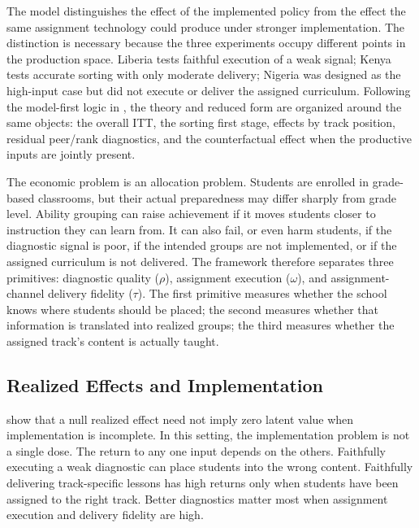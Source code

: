 \documentclass[11pt]{article}
\begin{document}
The model distinguishes the effect of the implemented policy from the effect the same assignment technology could produce under stronger implementation. The distinction is necessary because the three experiments occupy different points in the production space. Liberia tests faithful execution of a weak signal; Kenya tests accurate sorting with only moderate delivery; Nigeria was designed as the high-input case but did not execute or deliver the assigned curriculum. Following the model-first logic in \citet{duflo2011peer}, the theory and reduced form are organized around the same objects: the overall ITT, the sorting first stage, effects by track position, residual peer/rank diagnostics, and the counterfactual effect when the productive inputs are jointly present.

The economic problem is an allocation problem. Students are enrolled in grade-based classrooms, but their actual preparedness may differ sharply from grade level. Ability grouping can raise achievement if it moves students closer to instruction they can learn from. It can also fail, or even harm students, if the diagnostic signal is poor, if the intended groups are not implemented, or if the assigned curriculum is not delivered. The framework therefore separates three primitives: diagnostic quality ($\rho$), assignment execution ($\omega$), and assignment-channel delivery fidelity ($\tau$). The first primitive measures whether the school knows where students should be placed; the second measures whether that information is translated into realized groups; the third measures whether the assigned track's content is actually taught.

\subsection{Realized Effects and Implementation}

\citet{angristmeager2023} show that a null realized effect need not imply zero latent value when implementation is incomplete. In this setting, the implementation problem is not a single dose. The return to any one input depends on the others. Faithfully executing a weak diagnostic can place students into the wrong content. Faithfully delivering track-specific lessons has high returns only when students have been assigned to the right track. Better diagnostics matter most when assignment execution and delivery fidelity are high.
\end{document}
